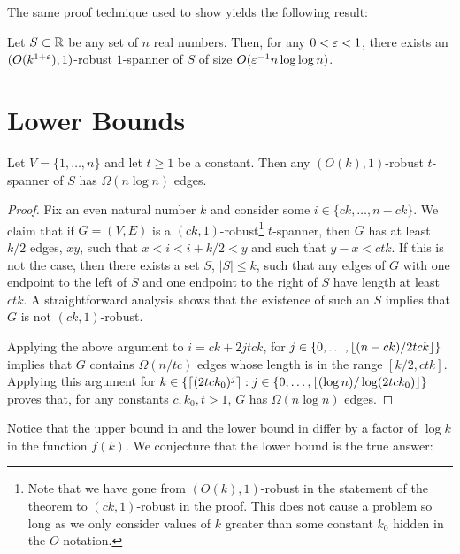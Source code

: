 \documentclass{patmorin}
\begin{document}
The same proof technique used to show  yields the
following result:

\begin{thm}
Let $S\subset \mathbb{R}$ be any set of $n$ real numbers.  Then, for any $0<\varepsilon
< 1$, there exists an $(O(k^{1+\varepsilon}),1)$-robust $1$-spanner of $S$
of size $O(\varepsilon^{-1}n\log\log n)$.
\end{thm}


\section{Lower Bounds}


\begin{thm}
Let $V=\{1,\ldots,n\}$ and let $t\ge 1$ be a constant.  Then any
$(O(k),1)$-robust $t$-spanner of $S$ has $\Omega(n\log n)$ edges.
\end{thm}

\begin{proof}
Fix an even natural number $k$ and consider some $i\in\{ck,\ldots,n-ck\}$.
We claim that if $G=(V,E)$ is a $(ck,1)$-robust\footnote{Note that we
have gone from $(O(k),1)$-robust in the statement of the theorem to
$(ck,1)$-robust in the proof.  This does not cause a problem so long
as we only consider values of $k$ greater than some constant $k_0$
hidden in the $O$ notation.} $t$-spanner, then $G$ has at least $k/2$
edges, $xy$, such that $x < i < i+k/2 < y$ and such that $y-x < ctk$.
If this is not the case, then there exists a set $S$, $|S|\le k$,
such that any edges of $G$ with one endpoint to the left of $S$
and one endpoint to the right of $S$ have length at least $ctk$.
A straightforward analysis shows that the existence of such an $S$
implies that $G$ is not $(ck,1)$-robust.

Applying the above argument to $i=ck+2jtck$, for
$j\in\{0,\ldots,{\lfloor (n-ck)/2tck \rfloor}\}$ implies that $G$ contains
$\Omega(n/tc)$ edges whose length is in the range $[k/2,ctk]$.  Applying
this argument for $k\in\{{\lceil (2tck_0)^{j} \rceil} : j\in\{0,\ldots,{\lfloor (\log
n)/\log(2tck_0) \rfloor}\}$ proves that, for any constants $c,k_0,t>1$, $G$
has $\Omega(n\log n)$ edges.
\end{proof}

Notice that the upper bound in  and the lower bound
in  differ by a factor of $\log k$ in the
function $f(k)$.  We conjecture that the lower bound is the true answer:
\end{document}
